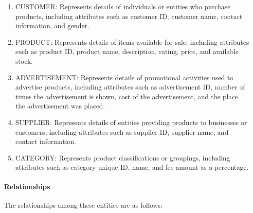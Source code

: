 \documentclass[
  letterpaper,
  DIV=11,
  numbers=noendperiod]{scrartcl}
\let\oldparagraph\paragraph
\renewcommand{\paragraph}[1]{\oldparagraph{#1}\mbox{}}
\providecommand{\tightlist}{%
  \setlength{\itemsep}{0pt}\setlength{\parskip}{0pt}}\usepackage{longtable,booktabs,array}
\begin{document}
\begin{enumerate}
\def\labelenumi{\arabic{enumi}.}
\tightlist
\item
  CUSTOMER: Represents details of individuals or entities who purchase
  products, including attributes such as customer ID, customer name,
  contact information, and gender.~
\item
  PRODUCT: Represents details of items available for sale, including
  attributes such as product ID, product name, description, rating,
  price, and available stock.~
\item
  ADVERTISEMENT: Represents details of promotional activities used to
  advertise products, including attributes such as advertisement ID,
  number of times the advertisement is shown, cost of the advertisement,
  and the place the advertisement was placed.~
\item
  SUPPLIER: Represents details of entities providing products to
  businesses or customers, including attributes such as supplier ID,
  supplier name, and contact information.~
\item
  CATEGORY: Represents product classifications or groupings, including
  attributes such as category unique ID, name, and fee amount as a
  percentage.
\end{enumerate}

\hypertarget{relationships}{%
\paragraph{Relationships}\label{relationships}}

The relationships among these entities are as follows:~
\end{document}
